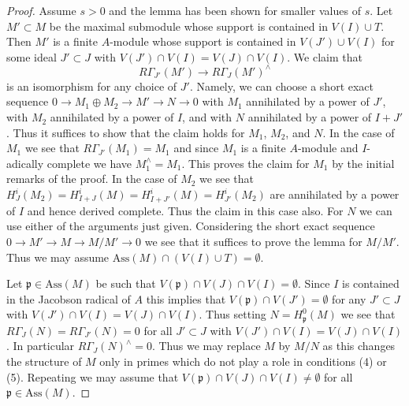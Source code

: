 \documentclass{stacks-project}
\theoremstyle{plain}
\theoremstyle{definition}
\theoremstyle{remark}
\numberwithin{equation}{subsection}
\begin{document}
\begin{proof}
\medskip\noindent
Assume $s > 0$ and the lemma has been shown for smaller values of $s$.
Let $M' \subset M$ be the maximal submodule whose support is contained
in $V(I) \cup T$. Then $M'$ is a finite $A$-module whose support
is contained in $V(J') \cup V(I)$ for some ideal $J' \subset J$
with $V(J') \cap V(I) = V(J) \cap V(I)$.
We claim that
$$
R\Gamma_{J'}(M') \to R\Gamma_J(M')^\wedge
$$
is an isomorphism for any choice of $J'$.
Namely, we can choose a short exact sequence
$0 \to M_1 \oplus M_2 \to M' \to N \to 0$ with
$M_1$ annihilated by a power of $J'$, with $M_2$ annihilated
by a power of $I$, and with $N$ annihilated by a power of $I + J'$.
Thus it suffices to show that the claim holds for $M_1$, $M_2$, and $N$.
In the case of $M_1$ we see that $R\Gamma_{J'}(M_1) = M_1$ and
since $M_1$ is a finite $A$-module and $I$-adically complete
we have $M_1^\wedge = M_1$. This proves the claim for $M_1$
by the initial remarks of the proof. In the case of $M_2$ we see that
$H^i_J(M_2) = H^i_{I + J}(M) = H^i_{I + J'}(M) = H^i_{J'}(M_2)$
are annihilated by a power of $I$ and hence derived complete.
Thus the claim in this case also. For $N$ we can use either of
the arguments just given. Considering the short exact sequence
$0 \to M' \to M \to M/M' \to 0$
we see that it suffices to prove the lemma for $M/M'$.
Thus we may assume $\text{Ass}(M) \cap (V(I) \cup T) = \emptyset$.

\medskip\noindent
Let $\mathfrak p \in \text{Ass}(M)$ be such that
$V(\mathfrak p) \cap V(J) \cap V(I) = \emptyset$.
Since $I$ is contained in the Jacobson radical of $A$ this implies
that $V(\mathfrak p) \cap V(J') = \emptyset$ for any
$J' \subset J$ with $V(J') \cap V(I) = V(J) \cap V(I)$.
Thus setting $N = H^0_\mathfrak p(M)$ we see that
$R\Gamma_J(N) = R\Gamma_{J'}(N) = 0$ for all
$J' \subset J$ with $V(J') \cap V(I) = V(J) \cap V(I)$.
In particular $R\Gamma_J(N)^\wedge = 0$.
Thus we may replace $M$ by $M/N$ as this changes the
structure of $M$ only in primes which do not play
a role in conditions (4) or (5). Repeating we may assume that
$V(\mathfrak p) \cap V(J) \cap V(I) \not = \emptyset$
for all $\mathfrak p \in \text{Ass}(M)$.


\end{proof}
\end{document}
